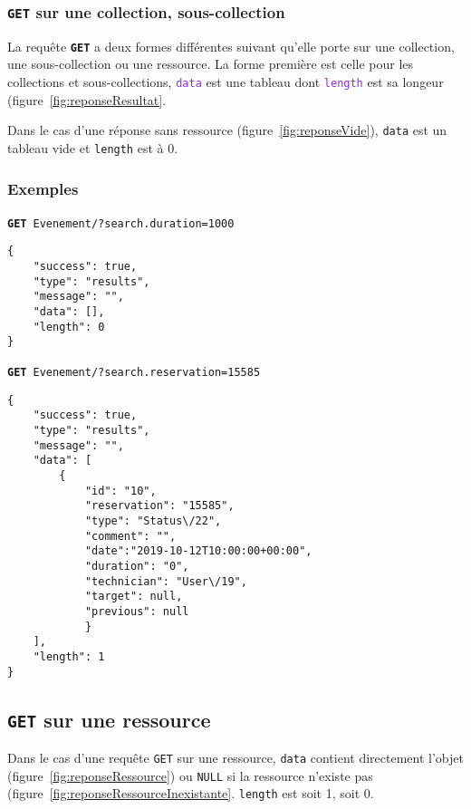 \documentclass[a4paper,twoside]{article}
\newcommand{\verbe}[1]{\texttt{\textbf{#1}}}
\newcommand{\adresse}[1]{\texttt{#1}}
\newcommand{\requete}[2]{\verbe{#1}~\adresse{#2}}
\newcommand{\attribut}[1]{\textcolor{BlueViolet}{\texttt{#1}}}
\begin{document}
\subsubsection{\verbe{GET} sur une collection, sous-collection}

La requête \verbe{GET} a deux formes différentes suivant qu'elle porte sur une collection, une sous-collection ou une ressource. La forme première est celle pour les collections et sous-collections, \attribut{data} est une tableau dont \attribut{length} est sa longeur (figure~\ref{fig:reponseResultat}.

Dans le cas d'une réponse sans ressource (figure~\ref{fig:reponseVide}), \texttt{data} est un tableau vide et \texttt{length} est à 0.

\subsubsection{Exemples}

\begin{figure*}
  \caption{Réponse sans résultat}
  \label{fig:reponseVide}
  \requete{GET}{Evenement/?search.duration=1000}
  \begin{verbatim}
{
	"success": true,
	"type": "results",
	"message": "",
	"data": [],
	"length": 0
}
  \end{verbatim}
\end{figure*}

\begin{figure*}
  \caption{Réponse avec résultat}
  \label{fig:reponseResultat}
    \requete{GET}{Evenement/?search.reservation=15585}
    \begin{verbatim}
{
	"success": true,
	"type": "results",
	"message": "",
	"data": [ 
		{
			"id": "10",
			"reservation": "15585",
			"type": "Status\/22",
			"comment": "",
			"date":"2019-10-12T10:00:00+00:00",
			"duration": "0",
			"technician": "User\/19",
			"target": null,
			"previous": null
			}
	],
	"length": 1
}
    \end{verbatim}
\end{figure*}

\subsection{\verbe{GET} sur une ressource}

Dans le cas d'une requête \texttt{GET} sur une ressource, \texttt{data} contient directement l'objet (figure~\ref{fig:reponseRessource}) ou \texttt{NULL} si la ressource n'existe pas (figure~\ref{fig:reponseRessourceInexistante}. \texttt{length} est soit 1, soit 0.
\end{document}
